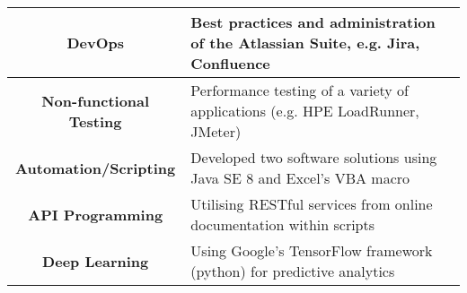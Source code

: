 \documentclass[11pt]{article}
\begin{document}
\begin{table}[h]
\begin{center}
\begin{tabular}{|c|l|}
\hline
{\bf DevOps} & Best practices and administration of the Atlassian Suite, e.g. Jira, Confluence\\
\hline
{\bf Non-functional Testing} & Performance testing of a variety of applications (e.g. HPE LoadRunner, JMeter)\\
\hline
{\bf Automation/Scripting} & Developed two software solutions using Java SE 8 and Excel's VBA macro\\
\hline
{\bf API Programming} & Utilising RESTful services from online documentation within scripts\\
\hline
{\bf Deep Learning} & Using Google's TensorFlow framework (python) for predictive analytics\\
\hline
\end{tabular}
\end{center}
\label{default}
\end{table}
\end{document}
